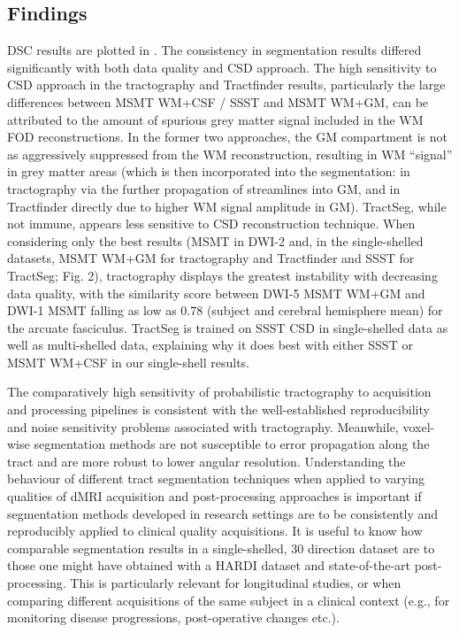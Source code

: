 \subsection{Findings}

DSC results are plotted in .
The consistency in segmentation results differed significantly with both data quality and CSD approach.
The high sensitivity to CSD approach in the tractography and Tractfinder results, particularly the large differences between MSMT WM+CSF / SSST and MSMT WM+GM, can be attributed to the amount of spurious grey matter signal included in the WM FOD reconstructions.
In the former two approaches, the GM compartment is not as aggressively suppressed from the WM reconstruction, resulting in WM “signal” in grey matter areas (which is then incorporated into the segmentation: in tractography via the further propagation of streamlines into GM, and in Tractfinder directly due to higher WM signal amplitude in GM).
TractSeg, while not immune, appears less sensitive to CSD reconstruction technique.
When considering only the best results (MSMT in DWI-2 and, in the single-shelled datasets, MSMT WM+GM for tractography and Tractfinder and SSST for TractSeg; Fig. 2), tractography displays the greatest instability with decreasing data quality, with the similarity score between DWI-5 MSMT WM+GM and DWI-1 MSMT falling as low as 0.78 (subject and cerebral hemisphere mean) for the arcuate fasciculus.
TractSeg is trained on SSST CSD in single-shelled data as well as multi-shelled data, explaining why it does best with either SSST or MSMT WM+CSF in our single-shell results.

The comparatively high sensitivity of probabilistic tractography to acquisition and processing pipelines is consistent with the well-established reproducibility and noise sensitivity problems associated with tractography.
Meanwhile, voxel-wise segmentation methods are not susceptible to error propagation along the tract and are more robust to lower angular resolution.
Understanding the behaviour of different tract segmentation techniques when applied to varying qualities of dMRI acquisition and post-processing approaches is important if segmentation methods developed in research settings are to be consistently and reproducibly applied to clinical quality acquisitions.
It is useful to know how comparable segmentation results in a single-shelled, 30 direction dataset are to those one might have obtained with a HARDI dataset and state-of-the-art post-processing.
This is particularly relevant for longitudinal studies, or when comparing different acquisitions of the same subject in a clinical context (e.g., for monitoring disease progressions, post-operative changes etc.).


